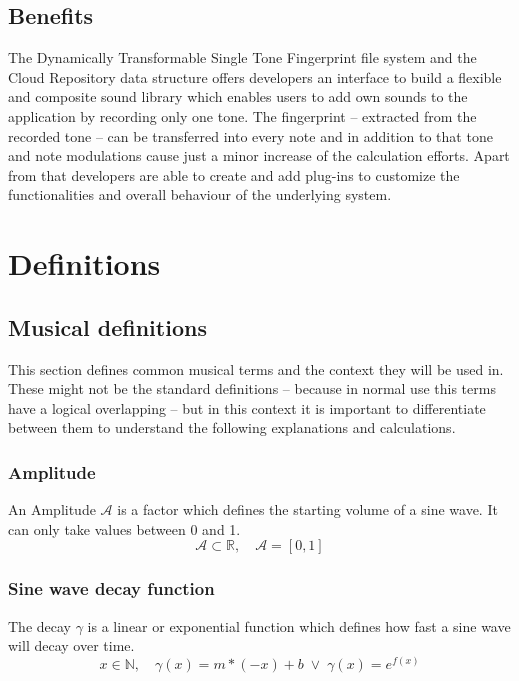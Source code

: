 \documentclass[a4paper,12pt]{report}
\newcommand{\R}{\mathbb{R}}
\newcommand{\N}{\mathbb{N}}
\begin{document}
	\section{Benefits}
	
	The Dynamically Transformable Single Tone Fingerprint file system and the Cloud Repository data structure offers developers an interface to build a flexible and composite sound library which enables users to add own sounds to the application by recording only one tone. The fingerprint – extracted from the recorded tone – can be transferred into every note and in addition to that tone and note modulations cause just a minor increase of the calculation efforts. Apart from that developers are able to create and add plug-ins to customize the functionalities and overall behaviour of the underlying system.
	
	\chapter{Definitions}
	
	\section{Musical definitions}
	This section defines common musical terms and the context they will be used in. These might not be the standard definitions -- because in normal use this terms have a logical overlapping -- but in this context it is important to differentiate between them to understand the following explanations and calculations.
	\subsection{Amplitude}
	An Amplitude 
	\begin{math}
		\mathcal{A}
	\end{math} 
	is a factor which defines the starting volume of a sine wave. It can only take values between 0 and 1.
	\begin{equation*}
		\mathcal{A}\subset\R, \quad \mathcal{A}=[0, 1]
	\end{equation*}
	
	\subsection{Sine wave decay function}
	The decay
	\begin{math}
		\gamma
	\end{math}
	is a linear or exponential function which defines how fast a sine wave will decay over time.
	\begin{equation*}
		x\in\N, \quad \gamma(x)=m*(-x)+b \; \lor \; \gamma(x)=e^{f(x)}
	\end{equation*}
	
\end{document}
